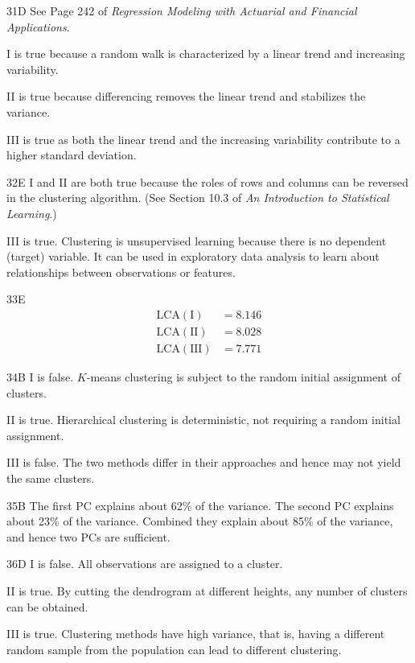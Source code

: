 \begin{solution}{31}{D}
See Page 242 of \textit{Regression Modeling with Actuarial and Financial Applications}.

I is true because a random walk is characterized by a linear trend and increasing variability.

II is true because differencing removes the linear trend and stabilizes the variance.

III is true as both the linear trend and the increasing variability contribute to a higher standard deviation.
\end{solution}

\begin{solution}{32}{E}
I and II are both true because the roles of rows and columns can be reversed in the clustering algorithm. (See Section 10.3 of \textit{An Introduction to Statistical Learning}.)

III is true. Clustering is unsupervised learning because there is no dependent (target) variable. It can be used in exploratory data analysis to learn about relationships between observations or features.
\end{solution}
\begin{solution}{33}{E}
\begin{align*}
\mathrm{LCA}(\mathrm{I}) &= 8.146 \\
\mathrm{LCA}(\mathrm{II}) &= 8.028 \\
\mathrm{LCA}(\mathrm{III}) &= 7.771
\end{align*}
\end{solution}

\begin{solution}{34}{B}
I is false. $K$-means clustering is subject to the random initial assignment of clusters.

II is true. Hierarchical clustering is deterministic, not requiring a random initial assignment.

III is false. The two methods differ in their approaches and hence may not yield the same clusters.
\end{solution}

\begin{solution}{35}{B}
The first PC explains about 62\% of the variance. The second PC explains about 23\% of the variance. Combined they explain about 85\% of the variance, and hence two PCs are sufficient.
\end{solution}

\begin{solution}{36}{D}
I is false. All observations are assigned to a cluster.

II is true. By cutting the dendrogram at different heights, any number of clusters can be obtained.

III is true. Clustering methods have high variance, that is, having a different random sample from the population can lead to different clustering.
\end{solution}

